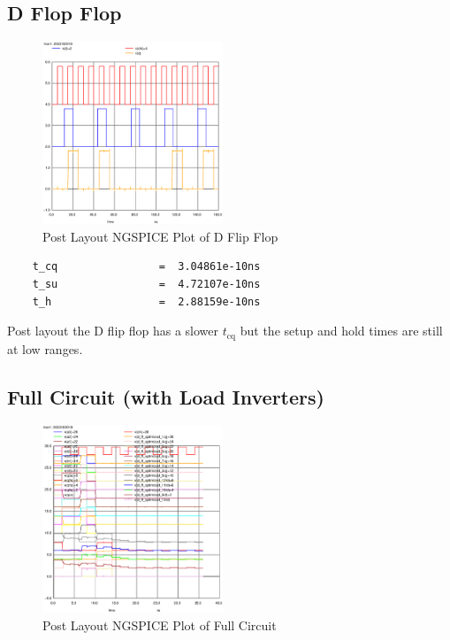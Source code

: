 \documentclass[conference]{IEEEtran}
\begin{document}
\subsection{D Flop Flop}

\begin{figure}[H]
    \centering
    \includegraphics[width=0.48\textwidth]{images/d_ff_optimized_post_tran.eps}
    \caption{Post Layout NGSPICE Plot of D Flip Flop}
\end{figure}

\begin{verbatim}
    t_cq                =  3.04861e-10ns
    t_su                =  4.72107e-10ns
    t_h                 =  2.88159e-10ns
\end{verbatim}

Post layout the D flip flop has a slower $t_{\text{cq}}$ but the setup and hold times are still at low ranges.

\subsection{Full Circuit (with Load Inverters)}

\begin{figure}[H]
    \centering
    \includegraphics[width=0.48\textwidth]{images/full_optimized_load_post_tran.eps}
    \caption{Post Layout NGSPICE Plot of Full Circuit}
\end{figure}
\end{document}
